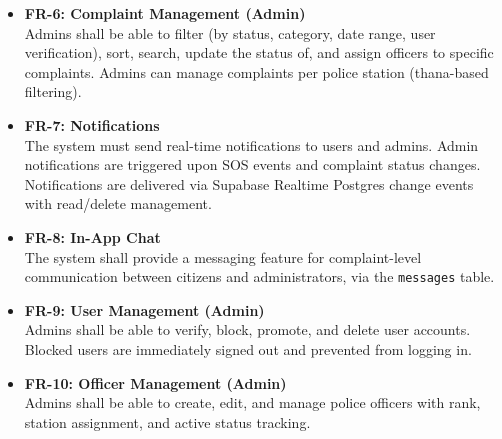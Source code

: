 \documentclass[11pt, a4paper]{report}
\begin{document}
\begin{itemize}
    \item \textbf{FR-6: Complaint Management (Admin)}\\
    Admins shall be able to filter (by status, category, date range, user verification), sort, search, update the status of, and assign officers to specific complaints. Admins can manage complaints per police station (thana-based filtering).

    \item \textbf{FR-7: Notifications}\\
    The system must send real-time notifications to users and admins. Admin notifications are triggered upon SOS events and complaint status changes. Notifications are delivered via Supabase Realtime Postgres change events with read/delete management.

    \item \textbf{FR-8: In-App Chat}\\
    The system shall provide a messaging feature for complaint-level communication between citizens and administrators, via the \texttt{messages} table.

    \item \textbf{FR-9: User Management (Admin)}\\
    Admins shall be able to verify, block, promote, and delete user accounts. Blocked users are immediately signed out and prevented from logging in.

    \item \textbf{FR-10: Officer Management (Admin)}\\
    Admins shall be able to create, edit, and manage police officers with rank, station assignment, and active status tracking.
\end{itemize}
\end{document}
